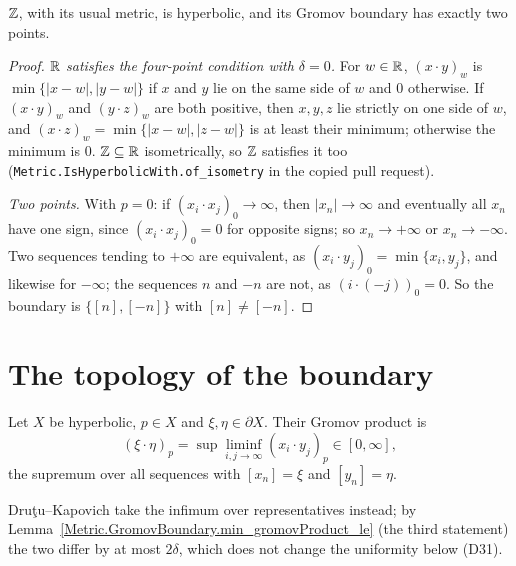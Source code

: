 \begin{lemma}
  \label{Int.card_gromovBoundary}
  $\mathbb{Z}$, with its usual metric, is hyperbolic, and its Gromov boundary has exactly two points.
\end{lemma}
\begin{proof}
  \emph{$\mathbb{R}$ satisfies the four-point condition with $\delta = 0$.} For $w \in \mathbb{R}$, $(x \cdot y)_w$
  is $\min\{|x - w|, |y - w|\}$ if $x$ and $y$ lie on the same side of $w$ and $0$ otherwise. If
  $(x \cdot y)_w$ and $(y \cdot z)_w$ are both positive, then $x, y, z$ lie strictly on one side of
  $w$, and $(x \cdot z)_w = \min\{|x - w|, |z - w|\}$ is at least their minimum; otherwise the
  minimum is $0$. $\mathbb{Z} \subseteq \mathbb{R}$ isometrically, so $\mathbb{Z}$ satisfies it too
  (\texttt{Metric.IsHyperbolicWith.of\_isometry} in the copied pull request).

  \emph{Two points.} With $p = 0$: if $(x_i \cdot x_j)_0 \to \infty$, then $|x_n| \to \infty$ and
  eventually all $x_n$ have one sign, since $(x_i \cdot x_j)_0 = 0$ for opposite signs; so $x_n \to
  +\infty$ or $x_n \to -\infty$. Two sequences tending to $+\infty$ are equivalent, as $(x_i \cdot
  y_j)_0 = \min\{x_i, y_j\}$, and likewise for $-\infty$; the sequences $n$ and $-n$ are not, as
  $(i \cdot (-j))_0 = 0$. So the boundary is $\{[n], [-n]\}$ with $[n] \ne [-n]$.
\end{proof}

\section*{The topology of the boundary}

\begin{definition}
  \label{Metric.GromovBoundary.gromovProduct}
  Let $X$ be hyperbolic, $p \in X$ and $\xi, \eta \in \partial X$. Their Gromov product is
  \[ (\xi \cdot \eta)_p = \sup \liminf_{i, j \to \infty} (x_i \cdot y_j)_p \in [0, \infty], \]
  the supremum over all sequences with $[x_n] = \xi$ and $[y_n] = \eta$.
\end{definition}

Dru\c{t}u--Kapovich take the infimum over representatives instead; by
Lemma~\ref{Metric.GromovBoundary.min_gromovProduct_le} (the third statement) the two differ by at
most $2\delta$, which does not change the uniformity below (D31).

